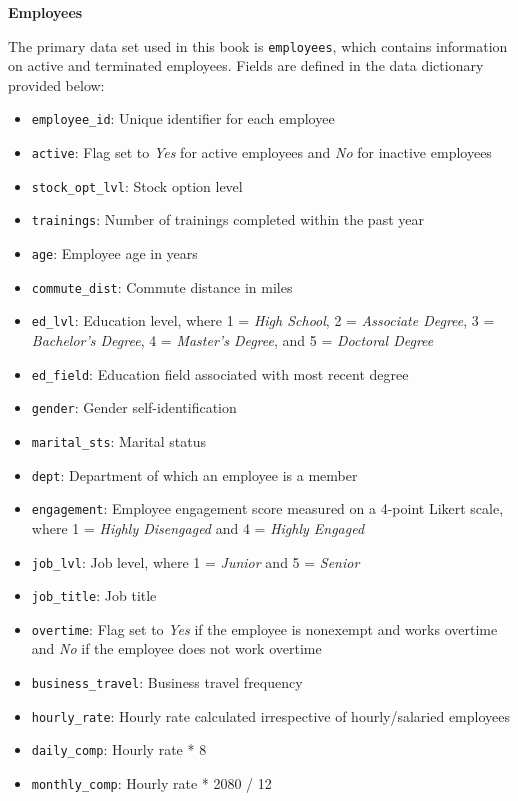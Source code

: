 \documentclass[
]{book}
\providecommand{\tightlist}{%
  \setlength{\itemsep}{0pt}\setlength{\parskip}{0pt}}
\begin{document}
\textbf{Employees}

The primary data set used in this book is \texttt{employees}, which contains information on active and terminated employees. Fields are defined in the data dictionary provided below:

\begin{itemize}
\tightlist
\item
  \texttt{employee\_id}: Unique identifier for each employee
\item
  \texttt{active}: Flag set to \emph{Yes} for active employees and \emph{No} for inactive employees
\item
  \texttt{stock\_opt\_lvl}: Stock option level
\item
  \texttt{trainings}: Number of trainings completed within the past year
\item
  \texttt{age}: Employee age in years
\item
  \texttt{commute\_dist}: Commute distance in miles
\item
  \texttt{ed\_lvl}: Education level, where 1 = \emph{High School}, 2 = \emph{Associate Degree}, 3 = \emph{Bachelor's Degree}, 4 = \emph{Master's Degree}, and 5 = \emph{Doctoral Degree}
\item
  \texttt{ed\_field}: Education field associated with most recent degree
\item
  \texttt{gender}: Gender self-identification
\item
  \texttt{marital\_sts}: Marital status
\item
  \texttt{dept}: Department of which an employee is a member
\item
  \texttt{engagement}: Employee engagement score measured on a 4-point Likert scale, where 1 = \emph{Highly Disengaged} and 4 = \emph{Highly Engaged}
\item
  \texttt{job\_lvl}: Job level, where 1 = \emph{Junior} and 5 = \emph{Senior}
\item
  \texttt{job\_title}: Job title
\item
  \texttt{overtime}: Flag set to \emph{Yes} if the employee is nonexempt and works overtime and \emph{No} if the employee does not work overtime
\item
  \texttt{business\_travel}: Business travel frequency
\item
  \texttt{hourly\_rate}: Hourly rate calculated irrespective of hourly/salaried employees
\item
  \texttt{daily\_comp}: Hourly rate * 8
\item
  \texttt{monthly\_comp}: Hourly rate * 2080 / 12

\end{itemize}
\end{document}
